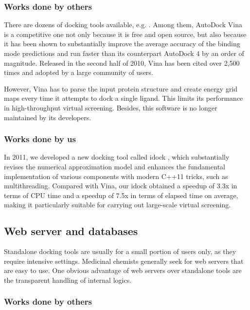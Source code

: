 \documentclass[a4paper,12pt]{article}
\begin{document}
\subsubsection*{Works done by others}

There are dozens of docking tools available, e.g. \cite{595,607,617,650,596}. Among them, AutoDock Vina \cite{595} is a competitive one not only because it is free and open source, but also because it has been shown to substantially improve the average accuracy of the binding mode predictions \cite{595} and run faster than its counterpart AutoDock 4 \cite{596} by an order of magnitude. Released in the second half of 2010, Vina has been cited over 2,500 times and adopted by a large community of users.

However, Vina has to parse the input protein structure and create energy grid maps every time it attempts to dock a single ligand. This limits its performance in high-throughput virtual screening. Besides, this software is no longer maintained by its developers.

\subsubsection*{Works done by us}

In 2011, we developed a new docking tool called idock \cite{1153}, which substantially revises the numerical approximation model and enhances the fundamental implementation of various components with modern C++11 tricks, such as multithreading. Compared with Vina, our idock obtained a speedup of 3.3x in terms of CPU time and a speedup of 7.5x in terms of elapsed time on average, making it particularly suitable for carrying out large-scale virtual screening.

\subsection*{Web server and databases}

Standalone docking tools are usually for a small portion of users only, as they require intensive settings. Medicinal chemists generally seek for web servers that are easy to use. One obvious advantage of web servers over standalone tools are the transparent handling of internal logics.

\subsubsection*{Works done by others}
\end{document}
